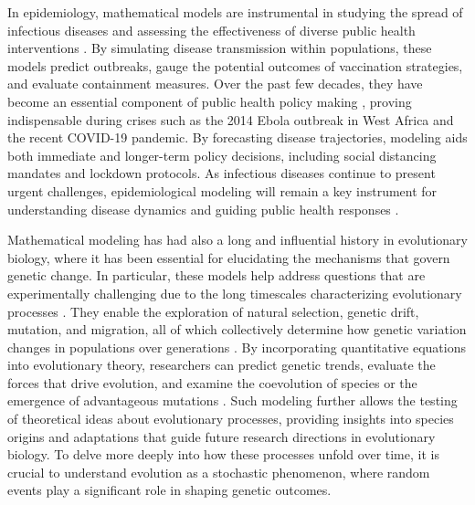 In epidemiology, mathematical models are instrumental in studying the spread of infectious diseases and assessing the effectiveness of diverse public health interventions \cite{siettos2013mathematical}. By simulating disease transmission within populations, these models predict outbreaks, gauge the potential outcomes of vaccination strategies, and evaluate containment measures. Over the past few decades, they have become an essential component of public health policy making \cite{temime2008rising, miguelAngel2021}, proving indispensable during crises such as the 2014 Ebola outbreak in West Africa and the recent COVID-19 pandemic. By forecasting disease trajectories, modeling aids both immediate and longer-term policy decisions, including social distancing mandates and lockdown protocols. As infectious diseases continue to present urgent challenges, epidemiological modeling will remain a key instrument for understanding disease dynamics and guiding public health responses \cite{siettos2013mathematical}.

Mathematical modeling has had also a long and influential history in evolutionary biology, where it has been essential for elucidating the mechanisms that govern genetic change. In particular, these models help address questions that are experimentally challenging due to the long timescales characterizing evolutionary processes \cite{brown2018evaluating}. They enable the exploration of natural selection, genetic drift, mutation, and migration, all of which collectively determine how genetic variation changes in populations over generations \cite{johri-aquadro2022recommendations,rosenberg-stadler-steel2025aMathematical}. By incorporating quantitative equations into evolutionary theory, researchers can predict genetic trends, evaluate the forces that drive evolution, and examine the coevolution of species or the emergence of advantageous mutations \cite{servedio2014not}. Such modeling further allows the testing of theoretical ideas about evolutionary processes, providing insights into species origins and adaptations that guide future research directions in evolutionary biology. To delve more deeply into how these processes unfold over time, it is crucial to understand evolution as a stochastic phenomenon, where random events play a significant role in shaping genetic outcomes.

